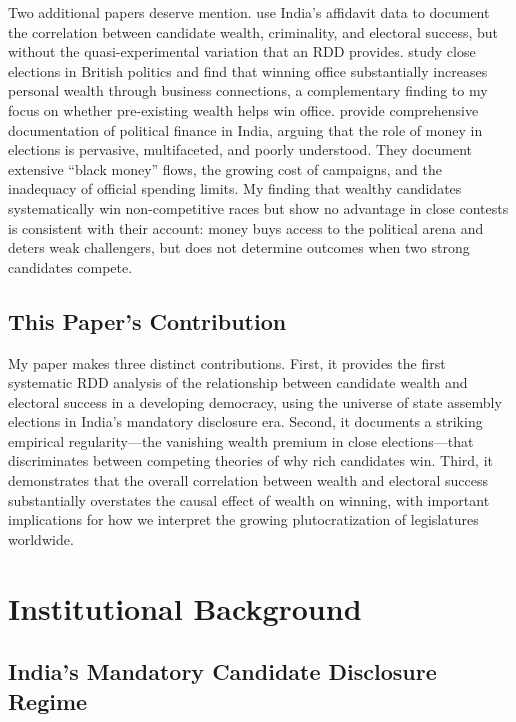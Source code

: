 \documentclass[12pt]{article}
\begin{document}
Two additional papers deserve mention. \citet{dutta2017wealth} use India's affidavit data to document the correlation between candidate wealth, criminality, and electoral success, but without the quasi-experimental variation that an RDD provides. \citet{eggers2009mps} study close elections in British politics and find that winning office substantially increases personal wealth through business connections, a complementary finding to my focus on whether pre-existing wealth helps win office. \citet{kapur2018rethinking} provide comprehensive documentation of political finance in India, arguing that the role of money in elections is pervasive, multifaceted, and poorly understood. They document extensive ``black money'' flows, the growing cost of campaigns, and the inadequacy of official spending limits. My finding that wealthy candidates systematically win non-competitive races but show no advantage in close contests is consistent with their account: money buys access to the political arena and deters weak challengers, but does not determine outcomes when two strong candidates compete.

\subsection{This Paper's Contribution}

My paper makes three distinct contributions. First, it provides the first systematic RDD analysis of the relationship between candidate wealth and electoral success in a developing democracy, using the universe of state assembly elections in India's mandatory disclosure era. Second, it documents a striking empirical regularity---the vanishing wealth premium in close elections---that discriminates between competing theories of why rich candidates win. Third, it demonstrates that the overall correlation between wealth and electoral success substantially overstates the causal effect of wealth on winning, with important implications for how we interpret the growing plutocratization of legislatures worldwide.


\section{Institutional Background}

\subsection{India's Mandatory Candidate Disclosure Regime}
\end{document}
